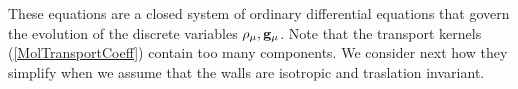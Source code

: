 \documentclass[b5paper,openright,10pt]{book}
\begin{document}

These equations are a closed system of ordinary differential equations
that  govern the  evolution of  the discrete  variables $\rho_\mu,{\bf
  g}_\mu$. Note  that the transport  kernels (\ref{MolTransportCoeff})
contain too many  components. We consider next how  they simplify when
we assume that the walls are isotropic and traslation invariant.
\end{document}
